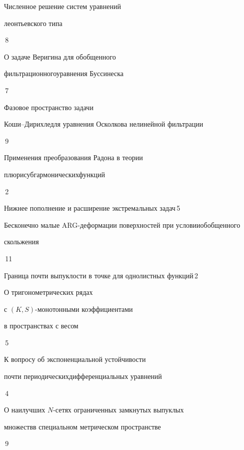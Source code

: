 

{Численное решение систем уравнений


леонтьевского типа}{\No\,8}




{О задаче Веригина для обобщенного 


фильтрационного\newline уравнения Буссинеска}{\No\,7}




{Фазовое пространство задачи


Коши--Дирихле\newline для уравнения Осколкова нелинейной фильтрации}{\No\,9}




{Применения преобразования Радона в теории


плюрисубгармонических\newline функций}{\No\,2}




{Нижнее пополнение и расширение экстремальных задач}{\No\,5}




{Бесконечно малые ARG-деформации поверхностей при условии\newline обобщенного 


скольжения}{\No\,11}




{Граница почти выпуклости в точке для однолистных функций}{\No\,2}




{О тригонометрических рядах


с $(K,S)$-монотонными коэффициентами\newline


в пространствах с весом}{\No\,5}




{К вопросу об экспоненциальной устойчивости  


почти периодических\newline дифференциальных уравнений}{\No\,4}




{О наилучших $N$-сетях ограниченных замкнутых выпуклых 


множеств\newline в специальном метрическом пространстве}{\No\,9}


